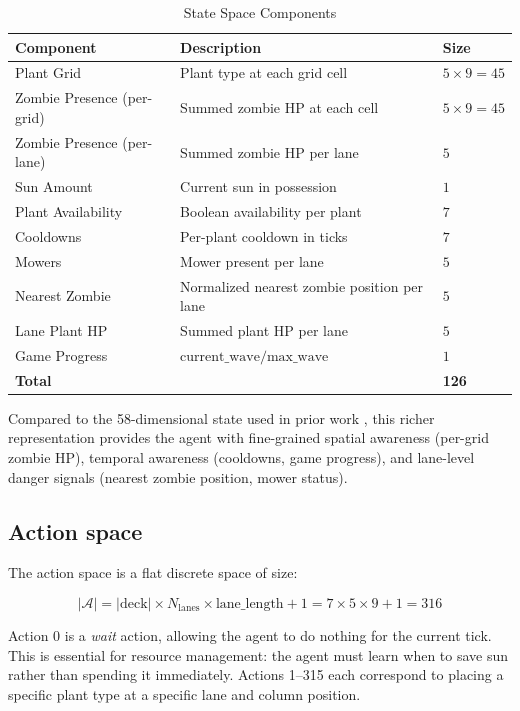 \documentclass[conference,onecolumn]{IEEEtran}
\begin{document}
\begin{table}[h]
\centering
\caption{State Space Components}
\label{tab:state}
\begin{tabular}{lll}
\hline
\textbf{Component} & \textbf{Description} & \textbf{Size} \\
\hline
Plant Grid & Plant type at each grid cell & $5 \times 9 = 45$ \\
Zombie Presence (per-grid) & Summed zombie HP at each cell & $5 \times 9 = 45$ \\
Zombie Presence (per-lane) & Summed zombie HP per lane & $5$ \\
Sun Amount & Current sun in possession & $1$ \\
Plant Availability & Boolean availability per plant & $7$ \\
Cooldowns & Per-plant cooldown in ticks & $7$ \\
Mowers & Mower present per lane & $5$ \\
Nearest Zombie & Normalized nearest zombie position per lane & $5$ \\
Lane Plant HP & Summed plant HP per lane & $5$ \\
Game Progress & $\text{current\_wave} / \text{max\_wave}$ & $1$ \\
\hline
\textbf{Total} & & \textbf{126} \\
\hline
\end{tabular}
\end{table}

Compared to the 58-dimensional state used in prior work \cite{hanadyg2021pvz}, this richer representation provides the agent with fine-grained spatial awareness (per-grid zombie HP), temporal awareness (cooldowns, game progress), and lane-level danger signals (nearest zombie position, mower status).
\subsection{Action space}
The action space is a flat discrete space of size:

\begin{equation}
    |\mathcal{A}| = |\text{deck}| \times N_{\text{lanes}} \times \text{lane\_length} + 1 = 7 \times 5 \times 9 + 1 = 316
\end{equation}

Action 0 is a \textit{wait} action, allowing the agent to do nothing for the current tick. This is essential for resource management: the agent must learn when to save sun rather than spending it immediately. Actions 1--315 each correspond to placing a specific plant type at a specific lane and column position.
\end{document}
